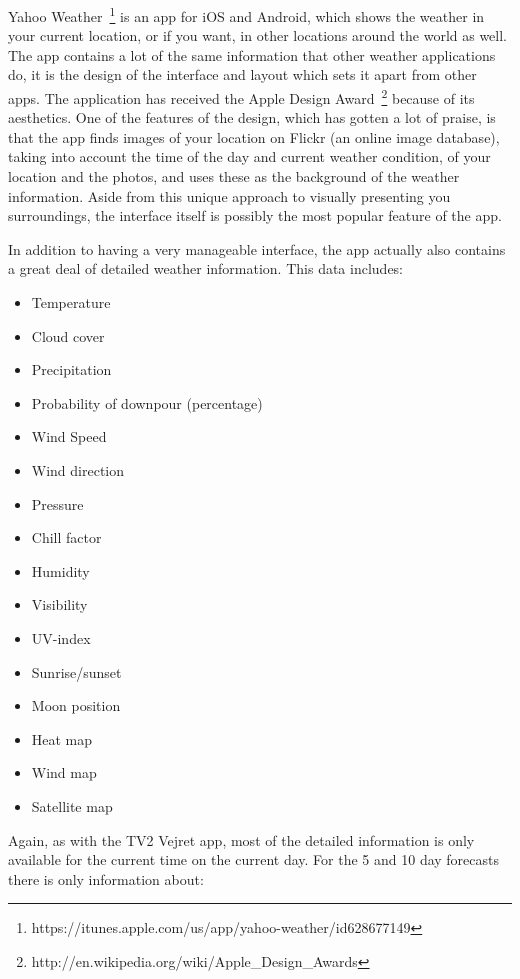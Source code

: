 Yahoo Weather~\footnote{https://itunes.apple.com/us/app/yahoo-weather/id628677149} is an app for iOS and Android, which shows the weather in your current location, or if you want, in other locations around the world as well.
The app contains a lot of the same information that other weather applications do, it is the design of the interface and layout which sets it apart from other apps. 
The application has received the Apple Design Award~\footnote{http://en.wikipedia.org/wiki/Apple\_Design\_Awards} because of its aesthetics. 
One of the features of the design, which has gotten a lot of praise, is that the app finds images of your location on Flickr (an online image database), taking into account the time of the day and current weather condition, of your location and the photos, and uses these as the background of the weather information. 
Aside from this unique approach to visually presenting you surroundings, the interface itself is possibly the most popular feature of the app.

In addition to having a very manageable interface, the app actually also contains a great deal of detailed weather information. This data includes:

\begin{itemize}
    \item Temperature
    \item Cloud cover
    \item Precipitation
    \item Probability of downpour (percentage)
    \item Wind Speed
    \item Wind direction
    \item Pressure
    \item Chill factor
    \item Humidity
    \item Visibility
    \item UV-index
    \item Sunrise/sunset
    \item Moon position
    \item Heat map
    \item Wind map
    \item Satellite map
\end{itemize}

Again, as with the TV2 Vejret app, most of the detailed information is only available for the current time on the current day. 
For the 5 and 10 day forecasts there is only information about:

